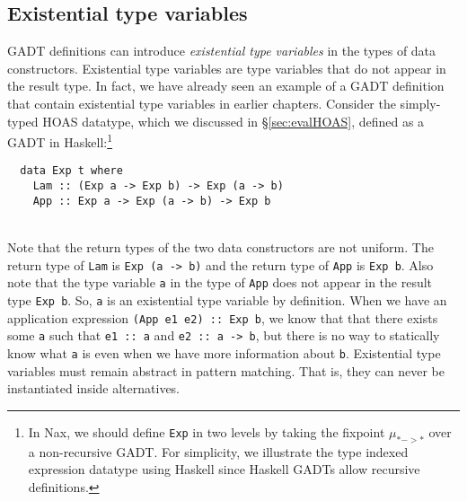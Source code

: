 \subsection{Existential type variables}
\label{sec:naxTyInfer:gadt:ex}
GADT definitions can introduce \emph{existential type variables}
in the types of data constructors. Existential type variables are
type variables that do not appear in the result type. In fact,
we have already seen an example of a GADT definition that contain
existential type variables in earlier chapters. Consider
the simply-typed HOAS datatype, which we discussed in \S\ref{sec:evalHOAS},
defined as a GADT in Haskell:\footnote{
	In Nax, we should define \texttt{Exp} in two levels
	by taking the fixpoint $\mu_{* -> *}$ over a non-recursive GADT.
	For simplicity, we illustrate the type indexed expression datatype
	using Haskell since Haskell GADTs allow recursive definitions.}
\vspace*{-5.2ex}
\begin{singlespace}
\begin{verbatim}
  data Exp t where
    Lam :: (Exp a -> Exp b) -> Exp (a -> b)
    App :: Exp a -> Exp (a -> b) -> Exp b
\end{verbatim}
\end{singlespace}
~\vspace*{-5.3ex}\\
Note that the return types of the two data constructors are not uniform.
The return type of \texttt{Lam} is \texttt{Exp (a -> b)} and
the return type of \texttt{App} is \texttt{Exp b}. Also note that
the type variable \texttt{a} in the type of \texttt{App} does not appear in
the result type \texttt{Exp b}. So, \texttt{a} is an existential type variable
by definition. When we have an application expression
\texttt{\;(App e1 e2)~::~Exp b}, we know that that there exists some \texttt{a}
such that \texttt{\;e1~::~a\;} and \texttt{\;e2~::~a -> b}, but there is no way
to statically know what \texttt{a} is even when we have more information about
\texttt{b}. Existential type variables must remain abstract in pattern matching.
That is, they can never be instantiated inside alternatives.

